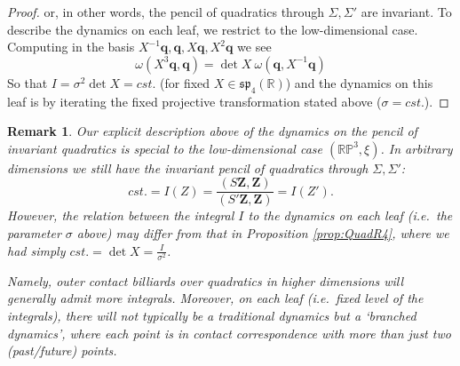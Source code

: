 \documentclass{article}
\newcommand{\R}{\mathbb{R}} %
\newtheorem{rmk}{Remark}
\begin{document}
\begin{appendix}
\begin{proof}
    or, in other words, the pencil of quadratics through $\Sigma,\Sigma'$ are invariant. To describe the dynamics on each leaf, we restrict to the low-dimensional case. Computing in the basis $X^{-1}\boldsymbol{q}, \boldsymbol{q}, X\boldsymbol{q}, X^2\boldsymbol{q}$ we see
    \[ \omega(X^3\boldsymbol{q}, \boldsymbol{q}) = \det X ~\omega(\boldsymbol{q},X^{-1}\boldsymbol{q})\]
    So that $I = \sigma^2 \det X = cst.$ (for fixed $X \in\mathfrak{sp}_4(\R)$) and the dynamics on this leaf is by iterating the fixed projective transformation stated above ($\sigma = cst.$).
\end{proof}
\begin{rmk}
\label{rmk:quadrics-higher-dim}
    Our explicit description above of the dynamics on the pencil of invariant quadratics is special to the low-dimensional case $(\mathbb{RP}^3, \xi)$. In arbitrary dimensions we still have the invariant pencil of quadratics through $\Sigma,\Sigma'$:
    \[ cst. = I(Z) =  \frac{(S\boldsymbol{Z}, \boldsymbol{Z})}{(S'\boldsymbol{Z},\boldsymbol{Z})} = I(Z'). \]
    However, the relation between the integral $I$ to the dynamics on each leaf (i.e.~the parameter $\sigma$ above) may differ from that in Proposition \ref{prop:QuadR4}, where we had simply $cst.  = \det X  = \frac{I}{\sigma^2}$.

    Namely, outer contact billiards over quadratics in higher dimensions will generally admit more integrals. Moreover, on each leaf (i.e.~fixed level of the integrals), there will not typically be a traditional dynamics but a `branched dynamics', where each point is in contact correspondence with {\em more} than just {\em two} (past/future) points.


\end{rmk}
\end{appendix}
\end{document}
